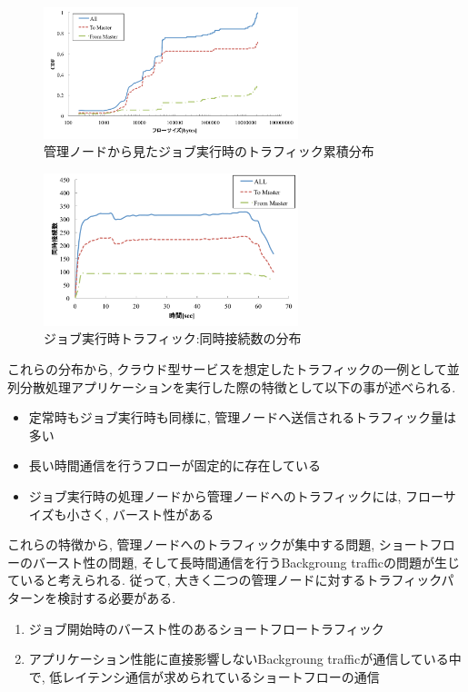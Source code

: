 \documentclass[11pt, a4paper, twocolumn]{jsarticle}
\begin{document}
\begin{figure}[t]
    \begin{center}
    \includegraphics[autoebb, width=210pt]{./img/job_cdf.pdf}
    \caption{管理ノードから見たジョブ実行時のトラフィック累積分布}
    \label{fig:job_cdf}
    \end{center}
\end{figure}

\begin{figure}[t]
    \begin{center}
    \includegraphics[autoebb, width=210pt]{./img/job_conc.pdf}
    \caption{ジョブ実行時トラフィック:同時接続数の分布}
    \label{fig:job_conc}
    \end{center}
\end{figure}

これらの分布から, クラウド型サービスを想定したトラフィックの一例として並列分散処理アプリケーションを実行した際の特徴として以下の事が述べられる.
\begin{itemize}
  \item 定常時もジョブ実行時も同様に, 管理ノードへ送信されるトラフィック量は多い
  \item 長い時間通信を行うフローが固定的に存在している
  \item ジョブ実行時の処理ノードから管理ノードへのトラフィックには, フローサイズも小さく, バースト性がある
\end{itemize}

これらの特徴から, 管理ノードへのトラフィックが集中する問題, ショートフローのバースト性の問題,
そして長時間通信を行うBackgroung trafficの問題が生じていると考えられる.
従って, 大きく二つの管理ノードに対するトラフィックパターンを検討する必要がある.
\begin{enumerate}
  \item ジョブ開始時のバースト性のあるショートフロートラフィック
  \item アプリケーション性能に直接影響しないBackgroung trafficが通信している中で,
  低レイテンシ通信が求められているショートフローの通信
\end{enumerate}
\end{document}
